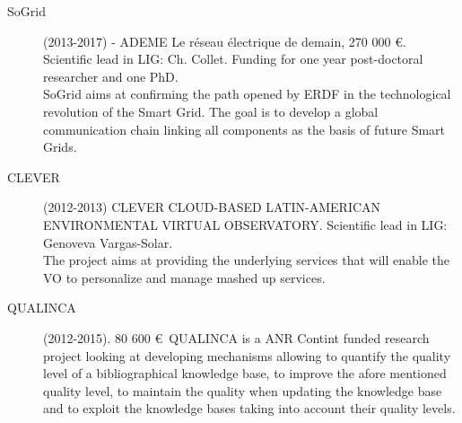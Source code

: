 \begin{description}
\item[SoGrid]  (2013-2017) - ADEME Le r{\'e}seau  {\'e}lectrique de demain, 270 000 \euro. Scientific lead in LIG: Ch. Collet. Funding for one year post-doctoral researcher and one PhD. \\
SoGrid aims at confirming the path opened by ERDF in the technological revolution of the Smart Grid. The goal is to develop a global communication chain linking all components as the basis of future Smart Grids. 

\item[CLEVER] (2012-2013)  CLEVER CLOUD-BASED LATIN-AMERICAN ENVIRONMENTAL VIRTUAL OBSERVATORY. Scientific lead in LIG: Genoveva Vargas-Solar. \\
The project aims at providing the underlying services that will enable the VO to personalize and manage mashed up services. 

\item[QUALINCA] (2012-2015). 80 600 \euro\ QUALINCA is a ANR Contint funded research project looking at developing mechanisms allowing to quantify the quality level of a bibliographical knowledge base, to improve the afore mentioned quality level, to maintain the quality when updating the knowledge base and to exploit the knowledge bases taking into account their quality levels. 


\end{description}

